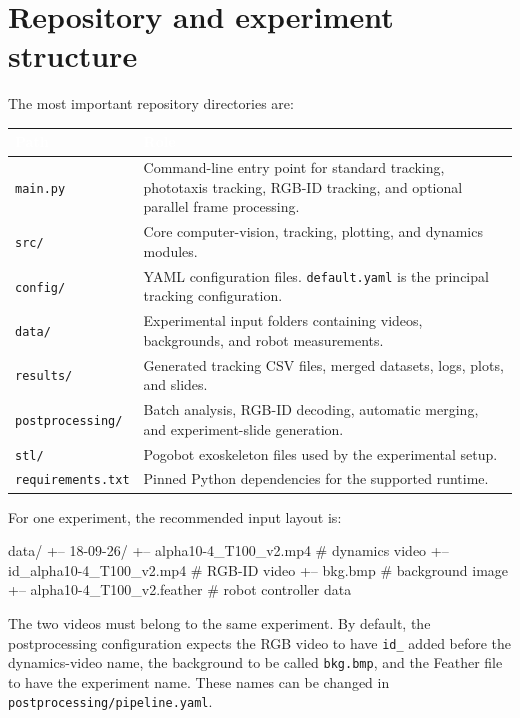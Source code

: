 \documentclass[11pt,a4paper]{article}
\begin{document}
\section{Repository and experiment structure}

The most important repository directories are:

\begingroup
\renewcommand{\arraystretch}{1.18}
\small
{}
\begin{tabularx}{\linewidth}{@{}>{\ttfamily\raggedright\arraybackslash}p{38mm}X@{}}
\toprule
\rowcolor{PogoGreen}
\textcolor{white}{\textbf{Path}} & \textcolor{white}{\textbf{Role}} \\
\midrule
\texttt{main.py} & Command-line entry point for standard tracking, phototaxis tracking, RGB-ID tracking, and optional parallel frame processing. \\
\texttt{src/} & Core computer-vision, tracking, plotting, and dynamics modules. \\
\texttt{config/} & YAML configuration files. \texttt{default.yaml} is the principal tracking configuration. \\
\texttt{data/} & Experimental input folders containing videos, backgrounds, and robot measurements. \\
\texttt{results/} & Generated tracking CSV files, merged datasets, logs, plots, and slides. \\
\texttt{postprocessing/} & Batch analysis, RGB-ID decoding, automatic merging, and experiment-slide generation. \\
\texttt{stl/} & Pogobot exoskeleton files used by the experimental setup. \\
\texttt{requirements.txt} & Pinned Python dependencies for the supported runtime. \\
\bottomrule
\end{tabularx}
\endgroup

For one experiment, the recommended input layout is:

\begin{codeblock}
data/
+-- 18-09-26/
    +-- alpha10-4_T100_v2.mp4          # dynamics video
    +-- id_alpha10-4_T100_v2.mp4       # RGB-ID video
    +-- bkg.bmp                        # background image
    +-- alpha10-4_T100_v2.feather      # robot controller data
\end{codeblock}

The two videos must belong to the same experiment. By default, the postprocessing configuration expects the RGB video to have \texttt{id\_} added before the dynamics-video name, the background to be called \texttt{bkg.bmp}, and the Feather file to have the experiment name. These names can be changed in \texttt{postprocessing/pipeline.yaml}.
\end{document}

